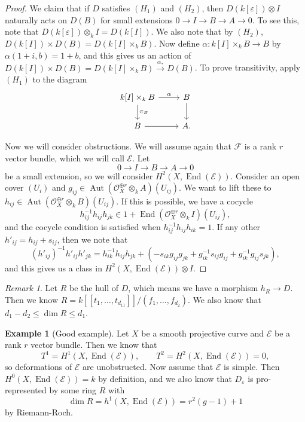 \documentclass[leqno, openany]{memoir}
\theoremstyle{definition}
\newtheorem{exm}[thm]{Example}
\theoremstyle{remark}
\newtheorem{rmk}[thm]{Remark}
\theoremstyle{plain}
\theoremstyle{definition}
\theoremstyle{remark}
\newcommand{\ep}{\varepsilon}
\newcommand{\mc}[1]{\mathcal{#1}}
\DeclareMathOperator{\End}{End}
\DeclareMathOperator{\Aut}{Aut}
\begin{document}
\begin{proof}
    We claim that if $D$ satisfies $(H_1)$ and $(H_2)$, then $D(k[\ep]) \otimes I$ naturally acts on $D(B)$ for small extensions $0 \to I \to B \to A \to 0$. To see this, note that $D(k[\ep]) \otimes_k I = D(k[I])$. We also note that by $(H_2)$, $D(k[I]) \times D(B) = D(k[I] \times_k B)$. Now define $\alpha \colon k[I] \times_k B \to B$ by $\alpha(1+i, b) = 1 + b$, and this gives us an action of $D(k[I]) \times D(B) = D(k[I] \times_k B) \xrightarrow{\alpha_*} D(B)$. To prove transitivity, apply $(H_1)$ to the diagram
    \begin{equation*}
    \begin{tikzcd}
        k[I] \times_k B \ar{r}{\alpha} \ar{d}{\pi_B} & B \ar{d} \\
        B\ar{r} & A.
    \end{tikzcd}
    \end{equation*}
    
    Now we will consider obstructions. We will assume again that $\mc{F}$ is a rank $r$ vector bundle, which we will call $\mc{E}$. Let
    \[ 0 \to I \to B \to A \to 0 \]
    be a small extension, so we will consider $H^2(X, \End(\mc{E}))$. Consider an open cover $(U_i)$ and $g_{ij} \in \Aut(\mc{O}_X^{\oplus r} \otimes_k A)(U_{ij})$. We want to lift these to $h_{ij} \in \Aut(\mc{O}_X^{\oplus r} \otimes_k B)(U_{ij})$. If this is possible, we have a cocycle
    \[ h_{ij}^{-1} h_{ij} h_{jk} \in 1 + \End(\mc{O}_X^{\oplus r} \otimes_k I)(U_{ij}), \]
    and the cocycle condition is satisfied when $h_{ij}^{-1} h_{ij} h_{ik} = 1$. If any other $h'_{ij} = h_{ij} +  s_{ij}$, then we note that
    \[ {(h'_{ij})}^{-1} h'_{ij} h'_{jk} = h_{ik}^{-1} h_{ij} h_{jk} + (- s_{ik} g_{ij} g_{jk} + g_{ik}^{-1} s_{ij} g_{ij} + g_{ik}^{-1} g_{ij} s_{jk}), \]
    and this gives us a class in $H^2(X, \End(\mc{E})) \otimes I$.
\end{proof}

\begin{rmk}
    Let $R$ be the hull of $D$, which means we have a morphism $h_R \to D$. Then we know $R = k[[t_1, \ldots, t_{d_11}]] / (f_1, \ldots, f_{d_2})$. We also know that $d_1 - d_2 \leq \dim R \leq d_1$.
\end{rmk}

\begin{exm}[Good example]
    Let $X$ be a smooth projective curve and $\mc{E}$ be a rank $r$ vector bundle. Then we know that 
    \[ T^1 = H^1(X, \End(\mc{E})), \qquad T^2 = H^2(X, \End(\mc{E})) = 0, \]
    so deformations of $\mc{E}$ are unobstructed. Now assume that $\mc{E}$ is simple. Then $H^0(X, \End(\mc{E})) = k$ by definition, and we also know that $D_{\ep}$ is pro-represented by some ring $R$ with 
    \[ \dim R = h^1(X, \End(\mc{E})) = r^2(g-1) + 1 \]
    by Riemann-Roch.
\end{exm}
\end{document}
